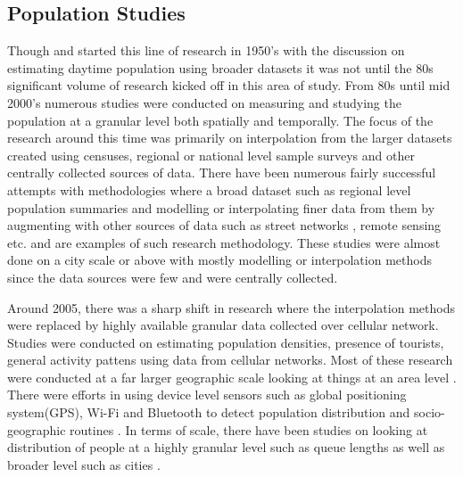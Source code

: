 \subsection{Population Studies}

Though \citet{foley1954} and \citet{schmitt1956} started this line of research in 1950's with the discussion on estimating daytime population using broader datasets it was not until the 80s significant volume of research kicked off in this area of study.
From 80s until mid 2000's numerous studies were conducted on measuring and studying the population at a granular level both spatially and temporally.
The focus of the research around this time was primarily on interpolation from the larger datasets created using censuses, regional or national level sample surveys and other centrally collected sources of data.
There have been numerous fairly successful attempts with methodologies where a broad dataset such  as regional level population summaries and modelling or interpolating finer data from them by augmenting with other sources of data such as street networks \citep{reibel2005}, remote sensing \citep{sutton1997, yuan1997, chen2002} etc.
\citet{dobson2000, dobson2003a, bhaduri2002, bhaduri2007} and \citep{mennis2003, mennis2006} are examples of such research methodology.
These studies were almost done on a city scale or above with mostly modelling or interpolation methods since the data sources were few and were centrally collected.

Around 2005, there was a sharp shift in research where the interpolation methods were replaced by highly available granular data collected over cellular network.
Studies were conducted on estimating population densities, presence of tourists, general activity pattens using data from cellular networks.
Most of these research were conducted at a far larger geographic scale looking at things at an area level \citep{pulselli2008, girardin2009, phithakkitnukoon2010, yuan2016}.
There were efforts in using device level sensors such as global positioning system(GPS), Wi-Fi and Bluetooth to detect population distribution and socio-geographic routines \citep{calabrese2010, rose2010, farrahi2010}.
In terms of scale, there have been studies on looking at distribution of people at a highly granular level such as queue lengths \cite[-5.5cm]{wang2013} as well as broader level such as cities \cite{deville2014}.

